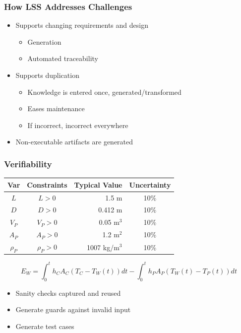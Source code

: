 \documentclass{beamer}
\begin{document}

\begin{frame}

\frametitle{How LSS Addresses Challenges}

\begin{itemize}
\item Supports changing requirements and design
\begin{itemize}
\item Generation
\item Automated traceability
\end{itemize}
\item Supports duplication 
\begin{itemize}
\item Knowledge is entered once, generated/transformed%
\item Eases maintenance
\item If incorrect, incorrect everywhere
\end{itemize}
\item Non-executable artifacts are generated
\end{itemize}
\end{frame}


\begin{frame}

\frametitle{Verifiability}

\begin{table} 
\centering
\begin{tabular}{c c r c } 
\toprule
\textbf{Var} & \textbf{Constraints} & \textbf{Typical Value} & \textbf{Uncertainty}\\ \midrule
$L$ & $L > 0$ & 1.5 m & 10\% \\ 
$D$ & $D > 0$ & 0.412 m & 10\% \\ 
$V_P$ & $V_P > 0$ & 0.05 m$^3$	& 10\% \\
$A_P$ & $A_P > 0$ & 1.2 m$^2$	& 10\% \\
$\rho_P$ & $\rho_P > 0$	& 1007 kg/m$^3$	& 10\% \\
\bottomrule
\end{tabular}
\label{tab:pcm}
\end{table}

\begin{equation*}
E_W = \int_{0}^{t} h_C A_C (T_C - T_W(t)) dt - \int_{0}^{t} h_P A_P (T_W(t) - T_P(t)) dt
\end{equation*}

\begin{itemize}
\item Sanity checks captured and reused
\item Generate guards against invalid input
\item Generate test cases
\end{itemize}
\end{frame}
\end{document}
